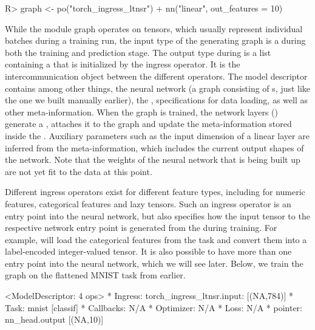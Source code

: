 \documentclass[article]{jss}
\theoremstyle{definition}
\begin{document}
\begin{CodeInput}
R> graph <- po("torch_ingress_ltnsr") %
+    nn("linear", out_features = 10) %
\end{CodeInput}

While the module graph operates on tensors, which usually represent individual batches during a training run, the input type of the generating graph is a  during both the training and prediction stage.
The output type during  is a list containing a  that is initialized by the  ingress operator.
It is the intercommunication object between the different  operators.
The model descriptor contains among other things, the neural network (a graph consisting of s, just like the one we built manually earlier), the , specifications for data loading, as well as other meta-information.
When the graph is trained, the network layers () generate a , attaches it to the graph and update the meta-information stored inside the .
Auxiliary parameters such as the input dimension of a linear layer are inferred from the meta-information, which includes the current output shapes of the network.
Note that the weights of the neural network that is being built up are not yet fit to the data at this point.

Different ingress operators exist for different feature types, including for numeric features, categorical features and lazy tensors.
Such an ingress operator is an entry point into the neural network, but also specifies how the input tensor to the respective network entry point is generated from the  during training.
For example,  will load the categorical features from the task and convert them into a label-encoded integer-valued tensor.
It is also possible to have more than one entry point into the neural network, which we will see later.
Below, we train the graph on the flattened MNIST task from earlier.

\begin{CodeOutput}
<ModelDescriptor: 4 ops>
* Ingress:  torch_ingress_ltnsr.input: [(NA,784)]
* Task:  mnist [classif]
* Callbacks:  N/A
* Optimizer:  N/A
* Loss:  N/A
* pointer:  nn_head.output [(NA,10)]
\end{CodeOutput}
\end{document}
